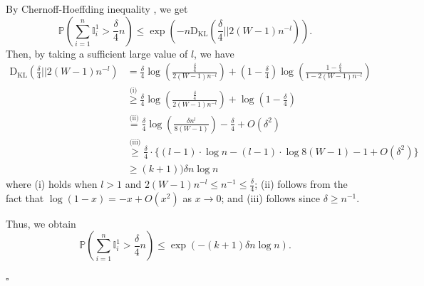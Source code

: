 \documentclass{article}
\begin{document}
By Chernoff-Hoeffding inequality \cite{thomas2006elements}, we get
\begin{equation}\label{s610}
	\mathbb{P}\left( \sum_{i=1}^{n} \mathbb{I}^1_i > \frac{\delta}{4} n  \right) \leq \exp \left( -n \text{D}_{\text{KL}}\left( \frac{\delta}{4} \bigg|\bigg| 2(W-1)n^{-l} \right)  \right).
\end{equation}
Then, by taking a sufficient large value of $l$, we have
\begin{equation}\label{s611}
	\begin{aligned}
		\text{D}_{\text{KL}} \left( \frac{\delta}{4} \bigg|\bigg| 2(W-1)n^{-l} \right) &= \frac{\delta}{4} \log \left( \frac{\frac{\delta}{4}}{2(W-1)n^{-l}} \right) + \left( 1-\frac{\delta}{4} \right) \log \left( \frac{1- \frac{\delta}{4}}{1-2(W-1)n^{-l}} \right) \\
		& \overset{\text{(i)}}{\geq} \frac{\delta}{4} \log \left( \frac{\frac{\delta}{4}}{2(W-1)n^{-l}} \right) + \log \left( 1-\frac{\delta}{4} \right) \\
		& \overset{\text{(ii)}}{=} \frac{\delta}{4} \log \left( \frac{\delta n^{l}}{8(W-1)} \right) - \frac{\delta}{4} + O(\delta^2) \\
		& \overset{\text{(iii)}}{\geq} \frac{\delta}{4} \cdot \{ (l-1)\cdot \log n - (l-1)\cdot \log 8(W-1) - 1 + O(\delta^2) \} \\
  &\geq (k+1)) \delta n \log n
	\end{aligned}
\end{equation} 
where (i) holds when $l>1$ and $2(W-1)n^{-l} \leq n^{-1} \leq \frac{\delta}{4}$; (ii) follows from the fact that $\log (1-x) = -x + O(x^2)$ as $x \rightarrow 0$; and (iii) follows since $\delta \geq n^{-1}$.

Thus, we obtain
$$
\mathbb{P}\left( \sum_{i=1}^{n} \mathbb{I}^1_i > \frac{\delta}{4} n \right) \leq \exp (-(k+1) \delta n \log n).
$$
    
\hfill $\square$\par
\end{document}
